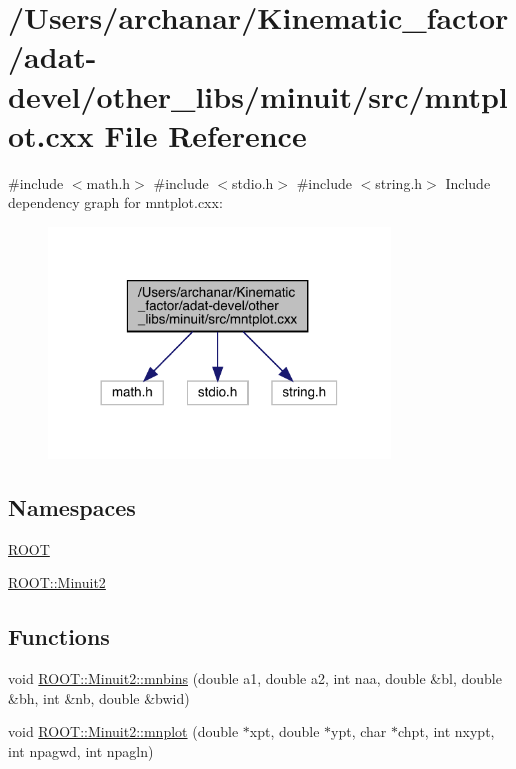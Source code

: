 \hypertarget{adat-devel_2other__libs_2minuit_2src_2mntplot_8cxx}{}\section{/\+Users/archanar/\+Kinematic\+\_\+factor/adat-\/devel/other\+\_\+libs/minuit/src/mntplot.cxx File Reference}
\label{adat-devel_2other__libs_2minuit_2src_2mntplot_8cxx}
{\ttfamily \#include $<$math.\+h$>$}\newline
{\ttfamily \#include $<$stdio.\+h$>$}\newline
{\ttfamily \#include $<$string.\+h$>$}\newline
Include dependency graph for mntplot.\+cxx\+:
\nopagebreak
\begin{figure}[H]
\begin{center}
\leavevmode
\includegraphics[width=257pt]{d9/d06/adat-devel_2other__libs_2minuit_2src_2mntplot_8cxx__incl}
\end{center}
\end{figure}
\subsection*{Namespaces}
\begin{DoxyCompactItemize}
\item 
 \mbox{\hyperlink{namespaceROOT}{R\+O\+OT}}
\item 
 \mbox{\hyperlink{namespaceROOT_1_1Minuit2}{R\+O\+O\+T\+::\+Minuit2}}
\end{DoxyCompactItemize}
\subsection*{Functions}
\begin{DoxyCompactItemize}
\item 
void \mbox{\hyperlink{namespaceROOT_1_1Minuit2_ac22433ee68c6274fa7028a58763d04bd}{R\+O\+O\+T\+::\+Minuit2\+::mnbins}} (double a1, double a2, int naa, double \&bl, double \&bh, int \&nb, double \&bwid)
\item 
void \mbox{\hyperlink{namespaceROOT_1_1Minuit2_a2c786d8330736525f0757ba1848f5bc4}{R\+O\+O\+T\+::\+Minuit2\+::mnplot}} (double $\ast$xpt, double $\ast$ypt, char $\ast$chpt, int nxypt, int npagwd, int npagln)
\end{DoxyCompactItemize}

